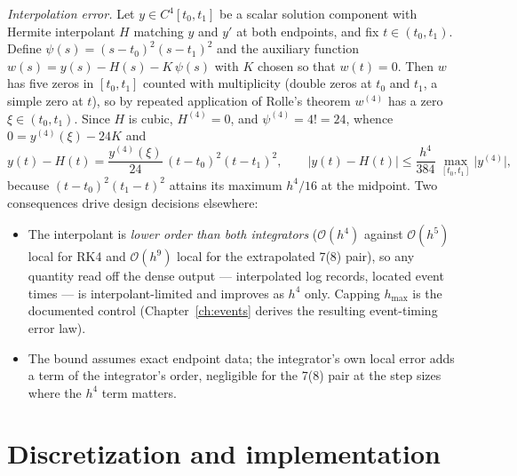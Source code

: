 \emph{Interpolation error.} Let $y \in C^{4}[t_0, t_1]$ be a scalar solution
component with Hermite interpolant $H$ matching $y$ and $y'$ at both
endpoints, and fix $t \in (t_0, t_1)$. Define
$\psi(s) = (s - t_0)^2 (s - t_1)^2$ and the auxiliary function
$w(s) = y(s) - H(s) - K\,\psi(s)$ with $K$ chosen so that $w(t) = 0$. Then
$w$ has five zeros in $[t_0, t_1]$ counted with multiplicity (double zeros
at $t_0$ and $t_1$, a simple zero at $t$), so by repeated application of
Rolle's theorem $w^{(4)}$ has a zero $\xi \in (t_0, t_1)$. Since $H$ is
cubic, $H^{(4)} = 0$, and $\psi^{(4)} = 4! = 24$, whence
$0 = y^{(4)}(\xi) - 24K$ and
\begin{equation}
  y(t) - H(t) = \frac{y^{(4)}(\xi)}{24}\,(t - t_0)^2 (t - t_1)^2,
  \qquad
  \bigl|y(t) - H(t)\bigr|
    \le \frac{h^{4}}{384}\, \max_{[t_0,t_1]} \bigl|y^{(4)}\bigr|,
  \label{eq:integrators:hermite:err}
\end{equation}
because $(t - t_0)^2(t_1 - t)^2$ attains its maximum $h^4/16$ at the
midpoint. Two consequences drive design decisions elsewhere:
\begin{itemize}
  \item The interpolant is \emph{lower order than both integrators}
    ($\mathcal{O}(h^4)$ against $\mathcal{O}(h^5)$ local for RK4 and
    $\mathcal{O}(h^9)$ local for the extrapolated 7(8) pair), so any
    quantity read off the dense output --- interpolated log records, located
    event times --- is interpolant-limited and improves as $h^4$ only.
    Capping $h_{\max}$ is the documented control
    (Chapter~\ref{ch:events} derives the resulting event-timing error law).
  \item The bound assumes exact endpoint data; the integrator's own local
    error adds a term of the integrator's order, negligible for the 7(8)
    pair at the step sizes where the $h^4$ term matters.
\end{itemize}

\section{Discretization and implementation}
\label{sec:integrators:implementation}

